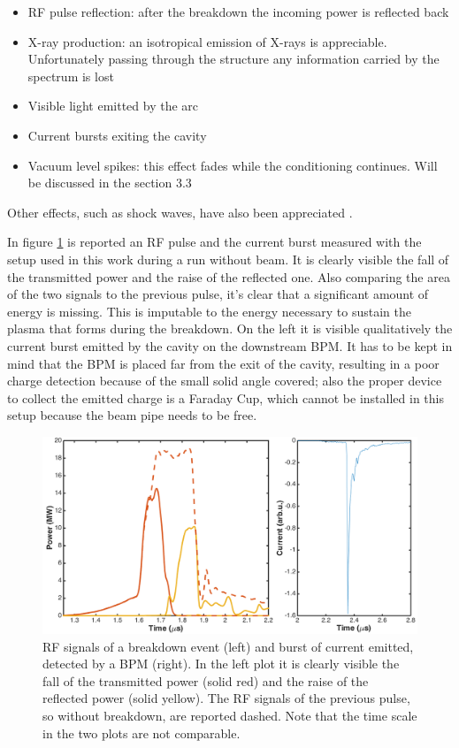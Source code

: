 \begin{itemize}
\item RF pulse reflection: after the breakdown the incoming power is reflected back
\item X-ray production: an isotropical emission of X-rays is appreciable. Unfortunately passing through the structure any information carried by the spectrum is lost
\item Visible light emitted by the arc
\item Current bursts exiting the cavity
\item Vacuum level spikes: this effect fades while the conditioning continues. Will be discussed in the section 3.3 
\end{itemize}
Other effects, such as shock waves, have also been appreciated \cite{Rajamaki:2143815}. 

In figure \ref{RFandBPM} is reported an RF pulse and the current burst measured with the setup used in this work during a run without beam. It is clearly visible the fall of the transmitted power and the raise of the reflected one. Also comparing the area of the two signals to the previous pulse, it's clear that a significant amount of energy is missing. This is imputable to the energy necessary to sustain the plasma that forms during the breakdown. On the left it is visible qualitatively the current burst emitted by the cavity on the downstream BPM. It has to be kept in mind that the BPM is placed far from the exit of the cavity, resulting in a poor charge detection because of the small solid angle covered; also the proper device to collect the emitted charge is a Faraday Cup, which cannot be installed in this setup because the beam pipe needs to be free. 


\begin{figure}[h]
\centering
\includegraphics[scale=0.33]{pictures/RFandBPM.png}
\caption{RF signals of a breakdown event (left) and burst of current emitted, detected by a BPM (right). In the left plot it is clearly visible the fall of the transmitted power (solid red) and the raise of the reflected power (solid yellow). The RF signals of the previous pulse, so without breakdown, are reported dashed. Note that the time scale in the two plots are not comparable.}
\label{RFandBPM}
\end{figure}





